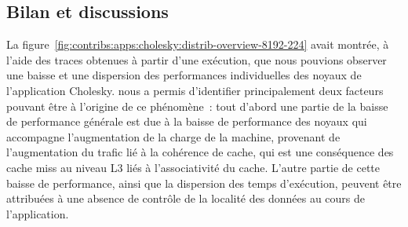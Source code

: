 \subsection{Bilan et discussions}

La figure~\ref{fig:contribs:apps:cholesky:distrib-overview-8192-224} avait montrée, à l'aide des traces obtenues à partir d'une exécution, que nous pouvions observer une baisse et une dispersion des performances individuelles des noyaux de l'application Cholesky.
\outil nous a permis d'identifier principalement deux facteurs pouvant être à l'origine de ce phénomène~: tout d'abord une partie de la baisse de performance générale est due à la baisse de performance des noyaux qui accompagne l'augmentation de la charge de la machine, provenant de l'augmentation du trafic lié à la cohérence de cache, qui est une conséquence des cache miss au niveau L3 liés à l'associativité du cache.
L'autre partie de cette baisse de performance, ainsi que la dispersion des temps d'exécution, peuvent être attribuées à une absence de contrôle de la localité des données au cours de l'application.
